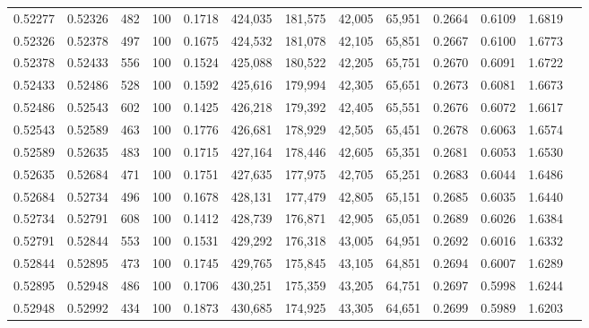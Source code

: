 \begin{tabular}{rrrrrrrrrrrrr}
0.52277 & 0.52326 &   482 & 100 &                                     0.1718 & 424,035 & 181,575 &  42,005 &  65,951 & 0.2664 & 0.6109 & 1.6819 \\
0.52326 & 0.52378 &   497 & 100 &                                     0.1675 & 424,532 & 181,078 &  42,105 &  65,851 & 0.2667 & 0.6100 & 1.6773 \\
0.52378 & 0.52433 &   556 & 100 &                                     0.1524 & 425,088 & 180,522 &  42,205 &  65,751 & 0.2670 & 0.6091 & 1.6722 \\
0.52433 & 0.52486 &   528 & 100 &                                     0.1592 & 425,616 & 179,994 &  42,305 &  65,651 & 0.2673 & 0.6081 & 1.6673 \\
0.52486 & 0.52543 &   602 & 100 &                                     0.1425 & 426,218 & 179,392 &  42,405 &  65,551 & 0.2676 & 0.6072 & 1.6617 \\
0.52543 & 0.52589 &   463 & 100 &                                     0.1776 & 426,681 & 178,929 &  42,505 &  65,451 & 0.2678 & 0.6063 & 1.6574 \\
0.52589 & 0.52635 &   483 & 100 &                                     0.1715 & 427,164 & 178,446 &  42,605 &  65,351 & 0.2681 & 0.6053 & 1.6530 \\
0.52635 & 0.52684 &   471 & 100 &                                     0.1751 & 427,635 & 177,975 &  42,705 &  65,251 & 0.2683 & 0.6044 & 1.6486 \\
0.52684 & 0.52734 &   496 & 100 &                                     0.1678 & 428,131 & 177,479 &  42,805 &  65,151 & 0.2685 & 0.6035 & 1.6440 \\
0.52734 & 0.52791 &   608 & 100 &                                     0.1412 & 428,739 & 176,871 &  42,905 &  65,051 & 0.2689 & 0.6026 & 1.6384 \\
0.52791 & 0.52844 &   553 & 100 &                                     0.1531 & 429,292 & 176,318 &  43,005 &  64,951 & 0.2692 & 0.6016 & 1.6332 \\
0.52844 & 0.52895 &   473 & 100 &                                     0.1745 & 429,765 & 175,845 &  43,105 &  64,851 & 0.2694 & 0.6007 & 1.6289 \\
0.52895 & 0.52948 &   486 & 100 &                                     0.1706 & 430,251 & 175,359 &  43,205 &  64,751 & 0.2697 & 0.5998 & 1.6244 \\
0.52948 & 0.52992 &   434 & 100 &                                     0.1873 & 430,685 & 174,925 &  43,305 &  64,651 & 0.2699 & 0.5989 & 1.6203 \\

\end{tabular}
